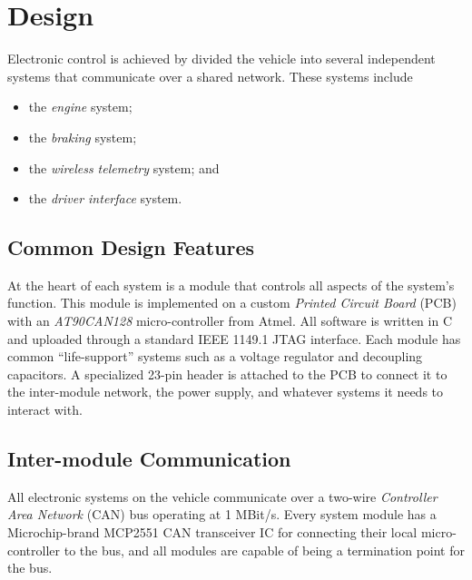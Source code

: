 %
%
%
%

\chapter{Design}
\label{ch:design}

Electronic control is achieved by divided the vehicle into several independent systems that communicate over a shared network. These systems include

\begin{itemize}
\item the \emph{engine} system;
\item the \emph{braking} system;
\item the \emph{wireless telemetry} system; and
\item the \emph{driver interface} system.
\end{itemize}

\section{Common Design Features}
\label{sec:common_design_features}


At the heart of each system is a module that controls all aspects of the system's function. This module is implemented on a custom \emph{Printed Circuit Board} (PCB) with an \emph{AT90CAN128} micro-controller from Atmel. All software is written in C and uploaded through a standard IEEE 1149.1 JTAG interface. Each module has common {}``life-support'' systems such as a voltage regulator and decoupling capacitors. A specialized 23-pin header is attached to the PCB to connect it to the inter-module network, the power supply, and whatever systems it needs to interact with.

\section{Inter-module Communication}
\label{sec:inter_module_communication}


All electronic systems on the vehicle communicate over a two-wire \emph{Controller Area Network} (CAN) bus operating at 1 MBit/s. Every system module has a Microchip-brand MCP2551 CAN transceiver IC for connecting their local micro-controller to the bus, and all modules are capable of being a termination point for the bus.


